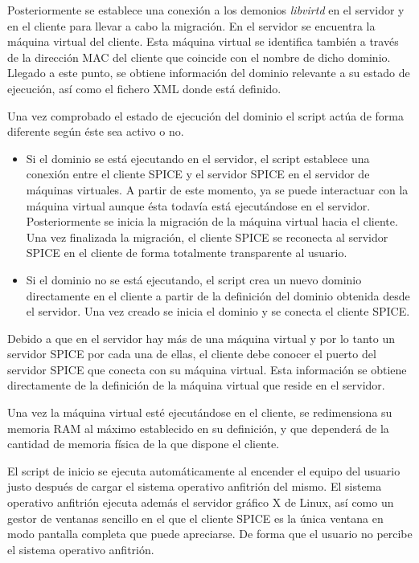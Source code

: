 \documentclass[spanisheDIVcalc,twoside,parskip-,pointlessnumbers,final]{scrbook}
\begin{document}
Posteriormente se establece una conexión a los demonios \emph{libvirtd
}en el servidor y en el cliente para llevar a cabo la migración. En
el servidor se encuentra la máquina virtual del cliente. Esta máquina
virtual se identifica también a través de la dirección MAC del cliente
que coincide con el nombre de dicho dominio. Llegado a este punto,
se obtiene información del dominio relevante a su estado de ejecución,
así como el fichero XML donde está definido. 

Una vez comprobado el estado de ejecución del dominio el script actúa
de forma diferente según éste sea activo o no.
\begin{itemize}
\item Si el dominio se está ejecutando en el servidor, el script establece
una conexión entre el cliente SPICE y el servidor SPICE en el servidor
de máquinas virtuales. A partir de este momento, ya se puede interactuar
con la máquina virtual aunque ésta todavía está ejecutándose en el
servidor. Posteriormente se inicia la migración de la máquina virtual
hacia el cliente. Una vez finalizada la migración, el cliente SPICE
se reconecta al servidor SPICE en el cliente de forma totalmente transparente
al usuario.
\item Si el dominio no se está ejecutando, el script crea un nuevo dominio
directamente en el cliente a partir de la definición del dominio obtenida
desde el servidor. Una vez creado se inicia el dominio y se conecta
el cliente SPICE.
\end{itemize}
Debido a que en el servidor hay más de una máquina virtual y por lo
tanto un servidor SPICE por cada una de ellas, el cliente debe conocer
el puerto del servidor SPICE que conecta con su máquina virtual. Esta
información se obtiene directamente de la definición de la máquina
virtual que reside en el servidor.

Una vez la máquina virtual esté ejecutándose en el cliente, se redimensiona
su memoria RAM al máximo establecido en su definición, y que dependerá
de la cantidad de memoria física de la que dispone el cliente.

El script de inicio se ejecuta automáticamente al encender el equipo
del usuario justo después de cargar el sistema operativo anfitrión
del mismo. El sistema operativo anfitrión ejecuta además el servidor
gráfico X de Linux, así como un gestor de ventanas sencillo en el
que el cliente SPICE es la única ventana en modo pantalla completa
que puede apreciarse. De forma que el usuario no percibe el sistema
operativo anfitrión.
\end{document}
